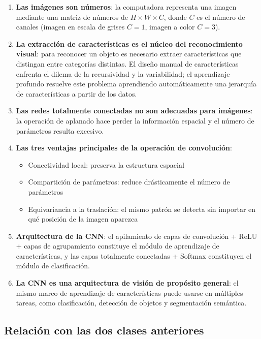 \documentclass[a4paper]{article}
\begin{document}
\begin{enumerate}
    \item \textbf{Las imágenes son números}: la computadora representa una imagen mediante una matriz de números de $H \times W \times C$, donde $C$ es el número de canales (imagen en escala de grises $C=1$, imagen a color $C=3$).

    \item \textbf{La extracción de características es el núcleo del reconocimiento visual}: para reconocer un objeto es necesario extraer características que distingan entre categorías distintas. El diseño manual de características enfrenta el dilema de la recursividad y la variabilidad; el aprendizaje profundo resuelve este problema aprendiendo automáticamente una jerarquía de características a partir de los datos.

    \item \textbf{Las redes totalmente conectadas no son adecuadas para imágenes}: la operación de aplanado hace perder la información espacial y el número de parámetros resulta excesivo.

    \item \textbf{Las tres ventajas principales de la operación de convolución}:
    \begin{itemize}
        \item Conectividad local: preserva la estructura espacial
        \item Compartición de parámetros: reduce drásticamente el número de parámetros
        \item Equivariancia a la traslación: el mismo patrón se detecta sin importar en qué posición de la imagen aparezca
    \end{itemize}

    \item \textbf{Arquitectura de la CNN}: el apilamiento de capas de convolución + ReLU + capas de agrupamiento constituye el módulo de aprendizaje de características, y las capas totalmente conectadas + Softmax constituyen el módulo de clasificación.

    \item \textbf{La CNN es una arquitectura de visión de propósito general}: el mismo marco de aprendizaje de características puede usarse en múltiples tareas, como clasificación, detección de objetos y segmentación semántica.
\end{enumerate}

\subsection{Relación con las dos clases anteriores}
\end{document}

